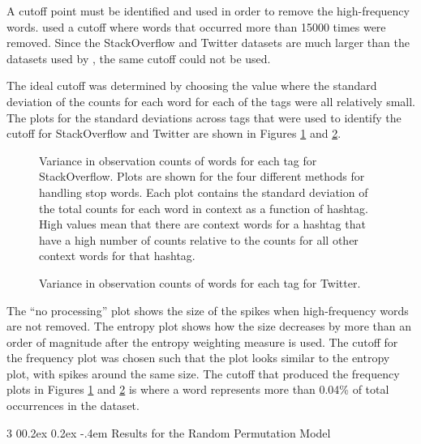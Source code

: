 \documentclass[man,floatsintext,donotrepeattitle]{apa6}
\makeatletter
\renewcommand{\subsubsection}{%
  \@startsection
  {subsubsection}%
  {3}%
  {\parindent}%
  {0\baselineskip \@plus 0.2ex \@minus 0.2ex}%
  {-.4em}%
  {\normalfont\normalsize\bfseries\addperi}}
\makeatother
\begin{document}
A cutoff point must be identified and used in order to remove the high-frequency words.
\textcite{Sahlgren2008} used a cutoff where words that occurred more than \num{15000} times were removed.
Since the StackOverflow and Twitter datasets are much larger than the datasets used by \citeauthor{Sahlgren2008}, the same cutoff could not be used.

The ideal cutoff was determined by choosing the value where the standard deviation of the counts for each word for each of the tags were all relatively small.
The plots for the standard deviations across tags that were used to identify the cutoff for StackOverflow and Twitter are shown in Figures \ref{figContextCutoffSO} and \ref{figContextCutoffT}.

\begin{figure}[!htbp]
  \caption{
    Variance in observation counts of words for each tag for StackOverflow.
    Plots are shown for the four different methods for handling stop words.
    Each plot contains the standard deviation of the total counts for each word in context as a function of hashtag.
    High values mean that there are context words for a hashtag that have a high number of counts relative to the counts for all other context words for that hashtag.
  }
  \label{figContextCutoffSO}
\end{figure}

\begin{figure}[!htbp]
  \caption{
    Variance in observation counts of words for each tag for Twitter.
  }
  \label{figContextCutoffT}
\end{figure}

The ``no processing'' plot shows the size of the spikes when high-frequency words are not removed.
The entropy plot shows how the size decreases by more than an order of magnitude after the entropy weighting measure is used.
The cutoff for the frequency plot was chosen such that the plot looks similar to the entropy plot, with spikes around the same size.
The cutoff that produced the frequency plots in Figures \ref{figContextCutoffSO} and \ref{figContextCutoffT} is where a word represents more than \num{.04}\% of total occurrences in the dataset.

\subsubsection{Results for the Random Permutation Model}
\end{document}

